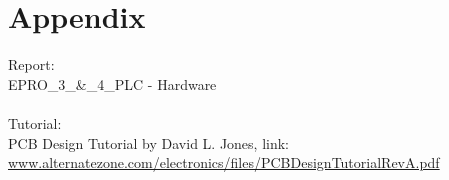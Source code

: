 \chapter{Appendix}
Report:\\
EPRO\_3\_\&\_4\_PLC - Hardware\\
\\Tutorial:\\
PCB Design Tutorial by David L. Jones, link:\\
\url{www.alternatezone.com/electronics/files/PCBDesignTutorialRevA.pdf}